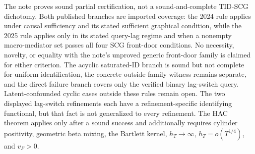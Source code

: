 \documentclass{article}
\begin{document}
The note proves sound partial certification, not a sound-and-complete TID-SCG dichotomy. Both published branches are imported coverage: the 2024 rule applies under causal sufficiency and its stated sufficient graphical condition, while the 2025 rule applies only in its stated query-lag regime and when a nonempty macro-mediator set passes all four SCG front-door conditions. No necessity, novelty, or equality with the note's unproved generic front-door family is claimed for either criterion. The acyclic saturated-ID branch is sound but not complete for uniform identification, the concrete outside-family witness remains separate, and the direct failure branch covers only the verified binary lag-switch query. Latent-confounded cyclic cases outside these rules remain open. The two displayed lag-switch refinements each have a refinement-specific identifying functional, but that fact is not generalized to every refinement. The HAC theorem applies only after a sound success and additionally requires cylinder positivity, geometric beta mixing, the Bartlett kernel, \(h_T\to\infty\), \(h_T=o(T^{1/4})\), and \(v_F>0\).
\end{document}
